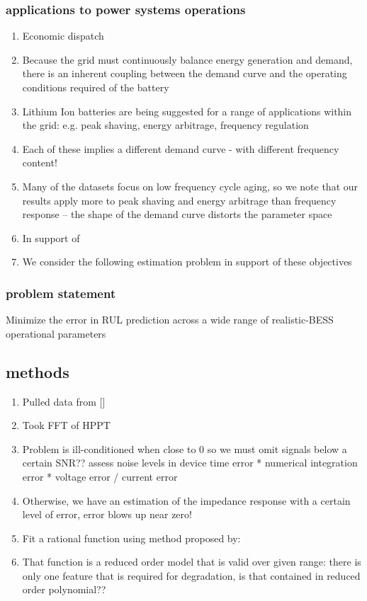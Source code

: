 \subsubsection{applications to power systems operations}
\begin{enumerate}
  \item Economic dispatch
  \item Because the grid must continuously balance energy generation and demand, there is an inherent coupling between the demand curve and the operating conditions required of the battery
  \item Lithium Ion batteries are being suggested for a range of applications within the grid: e.g. peak shaving, energy arbitrage, frequency regulation 
  \item Each of these implies a different demand curve - 
     \subitem with different frequency content!
  \item Many of the datasets focus on low frequency cycle aging, so we note that our results apply more to peak shaving and energy arbitrage than frequency response -- the shape of the demand curve distorts the parameter space
  \item In support of 
  \item We consider the following estimation problem in support of these objectives
\end{enumerate}

\subsubsection{problem statement}
Minimize the error in RUL prediction across a wide range of realistic-BESS operational parameters



\subsection{methods}
\begin{enumerate}
  
\item Pulled data from []
\item Took FFT of HPPT
\item Problem is ill-conditioned when close to 0 so we must  omit signals below a certain SNR??
  \subitem assess noise levels in device
  \subitem time error * numerical integration error * voltage error / current error
\item Otherwise, we have an estimation of the impedance response with a certain level of error, error blows up near zero!
\item Fit a rational function using method proposed by:
\item That function is a reduced order model that is valid over given range: there is only one feature that is required for degradation, is that contained in reduced order polynomial??

\end{enumerate}

